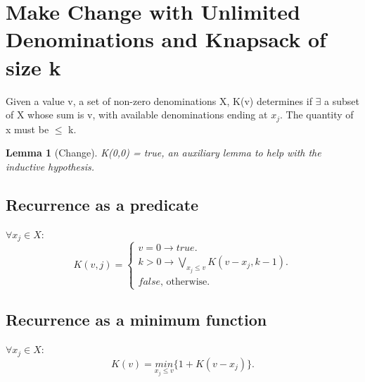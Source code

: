 \documentclass{article}
\newtheorem{lemma}[theorem]{Lemma}
\begin{document}
	
\section{Make Change with Unlimited Denominations and Knapsack of size k}
Given a value v, a set of non-zero denominations X, K(v) determines if $\exists$ a subset of X whose sum is v, with available denominations ending at $x_j$. The quantity of x must be $\leq$ k.

\begin{lemma} [Change]
\label{bc1}	
K(0,0) = true, an auxiliary lemma to help with the inductive hypothesis.
\end{lemma}

\subsection{Recurrence as a predicate}
$\forall x_j \in X$:\\
\begin{equation}
K(v,j)=			
\begin{cases}
v = 0 \to true.\\	
k>0 \to \underset{x_j \leq v}{\bigvee} K(v-x_j, k-1).\\
false \text{, otherwise.}
\end{cases}
\end{equation}

\subsection{Recurrence as a minimum function}
$\forall x_j \in X$:\\
\begin{equation}
K(v)=			
\underset{x_j \leq v}{min} \{1+K(v-x_j)\}.
\end{equation}
\end{document}
